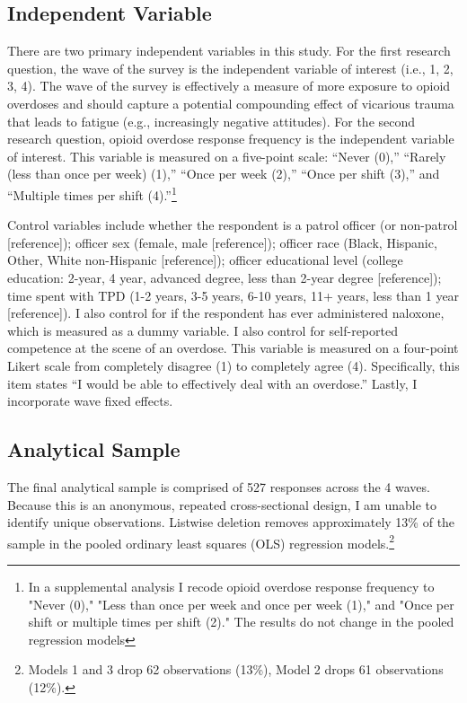 \subsection{Independent Variable}

There are two primary independent variables in this study. For the first research question, the wave of the survey is the independent variable of interest (i.e., 1, 2, 3, 4). The wave of the survey is effectively a measure of more exposure to opioid overdoses and should capture a potential compounding effect of vicarious trauma that leads to fatigue (e.g., increasingly negative attitudes). For the second research question, opioid overdose response frequency is the independent variable of interest. This variable is measured on a five-point scale: “Never (0),” “Rarely (less than once per week) (1),” “Once per week (2),” “Once per shift (3),” and “Multiple times per shift (4).”\footnote{In a supplemental analysis I recode opioid overdose response frequency to "Never (0)," "Less than once per week and once per week (1)," and "Once per shift or multiple times per shift (2)." The results do not change in the pooled regression models}

Control variables include whether the respondent is a patrol officer (or non-patrol [reference]); officer sex (female, male [reference]); officer race (Black, Hispanic, Other, White non-Hispanic [reference]); officer educational level (college education: 2-year, 4 year, advanced degree, less than 2-year degree [reference]); time spent with TPD (1-2 years, 3-5 years, 6-10 years, 11+ years, less than 1 year [reference]). I also control for if the respondent has ever administered naloxone, which is measured as a dummy variable. I also control for self-reported competence at the scene of an overdose. This variable is measured on a four-point Likert scale from completely disagree (1) to completely agree (4). Specifically, this item states “I would be able to effectively deal with an overdose.”  Lastly, I incorporate wave fixed effects.

\subsection{Analytical Sample}

The final analytical sample is comprised of 527 responses across the 4 waves. Because this is an anonymous, repeated cross-sectional design, I am unable to identify unique observations. Listwise deletion removes approximately 13\% of the sample in the pooled ordinary least squares (OLS) regression models.\footnote{Models 1 and 3 drop 62 observations (13\%), Model 2 drops 61 observations (12\%).} 

